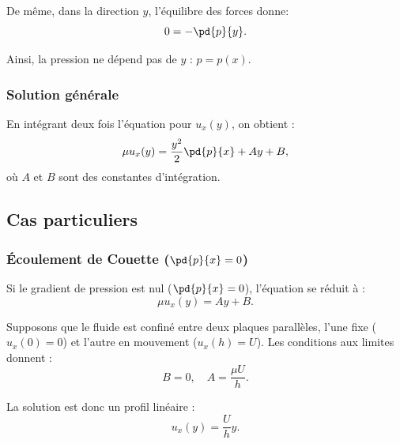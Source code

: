 De même, dans la direction $y$, l'équilibre des forces donne:
\begin{displaymath}
0 = -\pd{p}{y}.
\end{displaymath}

Ainsi, la pression ne dépend pas de $y$ : $p = p(x)$.

\subsubsection{Solution générale}
En intégrant deux fois l'équation pour $u_x(y)$, on obtient :
\begin{displaymath}
\mu u_x(y) = \frac{y^2}{2} \pd{p}{x} + A y + B,
\end{displaymath}
où $A$ et $B$ sont des constantes d'intégration.

\subsection{Cas particuliers}
\subsubsection{Écoulement de Couette ($\pd{p}{x} = 0$)}
Si le gradient de pression est nul ($\pd{p}{x} = 0$), l'équation se réduit à :
\begin{displaymath}
\mu u_x(y) = A y + B.
\end{displaymath}

Supposons que le fluide est confiné entre deux plaques parallèles, l'une fixe ($u_x(0) = 0$) et l'autre en mouvement ($u_x(h) = U$). Les conditions aux limites donnent :
\begin{displaymath}
B = 0, \quad A = \frac{\mu U}{h}.
\end{displaymath}

La solution est donc un profil linéaire :
\begin{displaymath}
u_x(y) = \frac{U}{h} y.
\end{displaymath}


